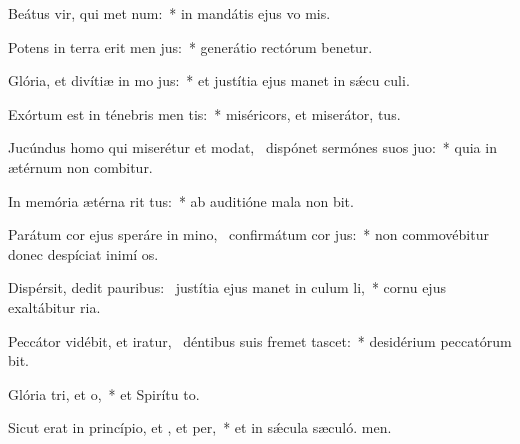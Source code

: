 \item Beátus vir, qui met num:~* in mandátis ejus vo mis.
\item Potens in terra erit men jus:~* generátio rectórum benetur.
\item Glória, et divítiæ in mo jus:~* et justítia ejus manet in sǽcu culi.
\item Exórtum est in ténebris men tis:~* miséricors, et miserátor,  tus.
\item Jucúndus homo qui miserétur et modat,~\pscross{} dispónet sermónes suos  juo:~* quia in ætérnum non combitur.
\item In memória ætérna rit tus:~* ab auditióne mala non bit.
\item Parátum cor ejus speráre in mino,~\pscross{} confirmátum  cor jus:~* non commovébitur donec despíciat inimí os.
\item Dispérsit, dedit pauribus:~\pscross{} justítia ejus manet in culum li,~* cornu ejus exaltábitur  ria.
\item Peccátor vidébit, et iratur,~\pscross{} déntibus suis fremet  tascet:~* desidérium peccatórum bit.
\item Glória tri, et o,~* et Spirítu to.
\item Sicut erat in princípio, et , et per,~* et in sǽcula sæculó. men.
